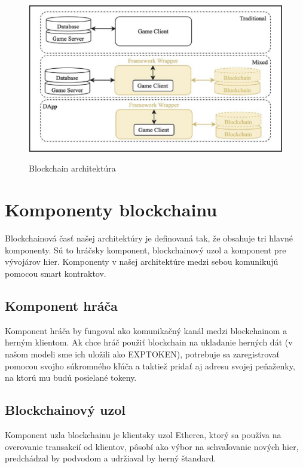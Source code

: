 \documentclass[10pt,twoside,slovak,a4paper]{article}
\begin{document}
\begin{figure}[h]
    \centering
    \includegraphics[scale=0.2]{blockchain_arch.png}
    \caption{Blockchain architektúra}\cite{Blockchain_architecture}  
    \label{fig:b-a}

\end{figure}





\section{Komponenty blockchainu} \label{komponenty}
Blockchainová časť našej architektúry je definovaná tak, že obsahuje tri hlavné komponenty. Sú to hráčsky komponent, blockchainový uzol a komponent pre vývojárov hier. Komponenty v našej architektúre medzi sebou komunikujú pomocou smart kontraktov.\cite{Blockchain_architecture}

\subsection{Komponent hráča} \label{komponenty:hrac}
Komponent hráča by fungoval ako komunikačný kanál medzi blockchainom a herným klientom. Ak chce hráč použiť blockchain na ukladanie herných dát (v našom modeli sme ich uložili ako EXPTOKEN), potrebuje sa zaregistrovať pomocou svojho súkromného kľúča a taktiež pridať aj adresu svojej peňaženky, na ktorú mu budú posielané tokeny.\cite{Blockchain_architecture}

\subsection{Blockchainový uzol} \label{komponenty:blockchain}
Komponent uzla blockchainu je klientsky uzol Etherea, ktorý sa používa na overovanie transakcií od klientov, pôsobí ako výbor na schvaľovanie nových hier, predchádzal by podvodom a udržiaval by herný štandard.\cite{Blockchain_architecture}
\end{document}

